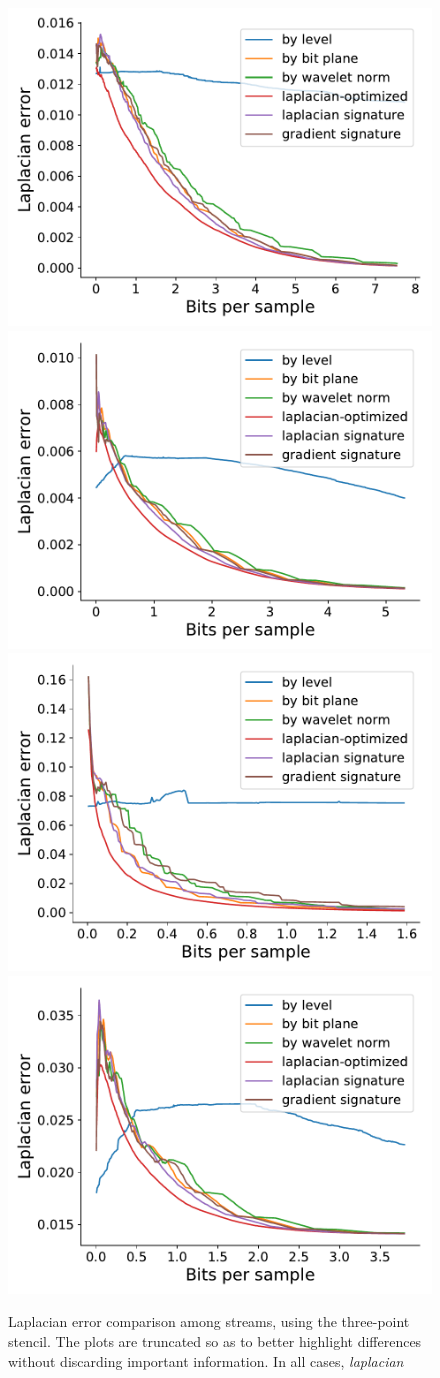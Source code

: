 \begin{figure}[h]
	\centering
	{\includegraphics[width=0.48\linewidth]{img/laplacian/laplacian-optimized-boiler.pdf}}
	{\includegraphics[width=0.48\linewidth]{img/laplacian/laplacian-optimized-diffusivity.pdf}}
	{\includegraphics[width=0.48\linewidth]{img/laplacian/laplacian-optimized-euler.pdf}}
	{\includegraphics[width=0.48\linewidth]{img/laplacian/laplacian-optimized-pressure.pdf}}
	\caption{Laplacian error comparison among streams, using the three-point stencil. The plots are
	truncated so as to better highlight differences without discarding important information. In all cases, \emph{laplacian}}
	\label{fig:laplacian-error-comparison}
\end{figure}

